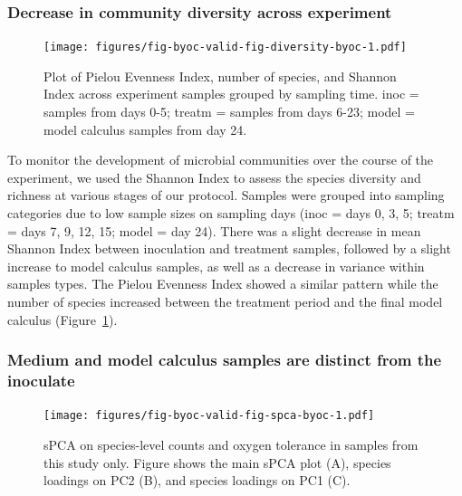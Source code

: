 \documentclass[
  letterpaper,
]{book}
\begin{document}
\hypertarget{decrease-in-community-diversity-across-experiment}{%
\subsubsection{Decrease in community diversity across
experiment}\label{decrease-in-community-diversity-across-experiment}}

\begin{figure}

{\centering \texttt{[image: figures/fig-byoc-valid-fig-diversity-byoc-1.pdf]}

}

\caption{\label{fig-diversity-byoc}Plot of Pielou Evenness Index, number
of species, and Shannon Index across experiment samples grouped by
sampling time. inoc = samples from days 0-5; treatm = samples from days
6-23; model = model calculus samples from day 24.}

\end{figure}

To monitor the development of microbial communities over the course of
the experiment, we used the Shannon Index to assess the species
diversity and richness at various stages of our protocol. Samples were
grouped into sampling categories due to low sample sizes on sampling
days (inoc = days 0, 3, 5; treatm = days 7, 9, 12, 15; model = day 24).
There was a slight decrease in mean Shannon Index between inoculation
and treatment samples, followed by a slight increase to model calculus
samples, as well as a decrease in variance within samples types. The
Pielou Evenness Index showed a similar pattern while the number of
species increased between the treatment period and the final model
calculus (Figure~\ref{fig-diversity-byoc}).

\hypertarget{medium-and-model-calculus-samples-are-distinct-from-the-inoculate}{%
\subsubsection{Medium and model calculus samples are distinct from the
inoculate}\label{medium-and-model-calculus-samples-are-distinct-from-the-inoculate}}

\begin{figure}

{\centering \texttt{[image: figures/fig-byoc-valid-fig-spca-byoc-1.pdf]}

}

\caption{\label{fig-spca-byoc}sPCA on species-level counts and oxygen
tolerance in samples from this study only. Figure shows the main sPCA
plot (A), species loadings on PC2 (B), and species loadings on PC1 (C).}

\end{figure}
\end{document}
